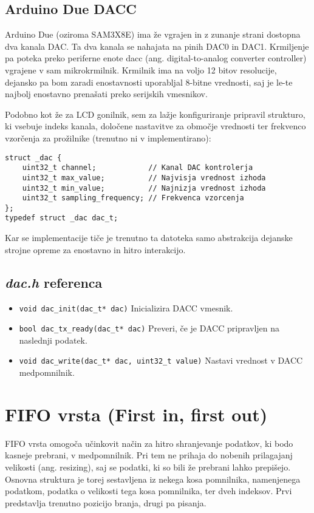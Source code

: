 \documentclass[12pt,a4paper,twoside,openright,slovene]{book}
\begin{document}
\subsection{Arduino Due DACC}
Arduino Due (oziroma SAM3X8E) ima že vgrajen in z zunanje strani dostopna dva kanala DAC. Ta dva kanala se nahajata na pinih DAC0 in DAC1. Krmiljenje pa poteka preko periferne enote dacc (ang. digital-to-analog converter controller) vgrajene v sam mikrokrmilnik. Krmilnik ima na voljo 12 bitov resolucije, dejansko pa bom zaradi enostavnosti uporabljal 8-bitne vrednosti, saj je le-te najbolj enostavno prenašati preko serijskih vmesnikov.

Podobno kot že za LCD gonilnik, sem za lažje konfiguriranje pripravil strukturo, ki vsebuje indeks kanala, določene nastavitve za območje vrednosti ter frekvenco vzorčenja za prožilnike (trenutno ni v implementirano):
\begin{lstlisting}
struct _dac {
    uint32_t channel;            // Kanal DAC kontrolerja
    uint32_t max_value;          // Najvisja vrednost izhoda
    uint32_t min_value;          // Najnizja vrednost izhoda
    uint32_t sampling_frequency; // Frekvenca vzorcenja
};
typedef struct _dac dac_t;
\end{lstlisting}

Kar se implementacije tiče je trenutno ta datoteka samo abstrakcija dejanske strojne opreme za enostavno in hitro interakcijo.


\subsection{\textit{dac.h} referenca}

\begin{itemize}
	\item[] \lstinline{void dac_init(dac_t* dac)}\newline
		Inicializira DACC vmesnik.
	\item[] \lstinline{bool dac_tx_ready(dac_t* dac)}\newline
		Preveri, če je DACC pripravljen na naslednji podatek.
	\item[] \lstinline{void dac_write(dac_t* dac, uint32_t value)}\newline
		Nastavi vrednost v DACC medpomnilnik.
\end{itemize}


\section{FIFO vrsta (First in, first out)}
FIFO vrsta omogoča učinkovit način za hitro shranjevanje podatkov, ki bodo kasneje prebrani, v medpomnilnik. Pri tem ne prihaja do nobenih prilagajanj velikosti (ang. resizing), saj se podatki, ki so bili že prebrani lahko prepišejo. Osnovna struktura je torej sestavljena iz nekega kosa pomnilnika, namenjenega podatkom, podatka o velikosti tega kosa pomnilnika, ter dveh indeksov. Prvi predstavlja trenutno pozicijo branja, drugi pa pisanja.
\end{document}
